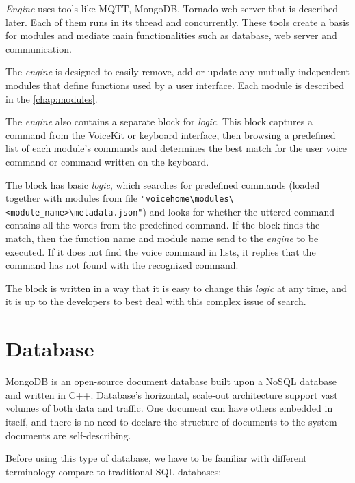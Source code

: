 \textit{Engine} uses tools like MQTT, MongoDB, Tornado web server that is described later. Each of them runs in its thread and concurrently. These tools create a basis for modules and mediate main functionalities such as database, web server and communication. 

The \textit{engine} is designed to easily remove, add or update any mutually independent modules that define functions used by a user interface. Each module is described in the \cref{chap:modules}.

The \textit{engine} also contains a separate block for \textit{logic}. This block captures a command from the VoiceKit or keyboard interface, then browsing a predefined list of each module's commands and determines the best match for the user voice command or command written on the keyboard.

The block has basic \textit{logic}, which searches for predefined commands (loaded together with modules from file \texttt{"voicehome\textbackslash modules\textbackslash <module\_name>\textbackslash metadata.json"}) and looks for whether the uttered command contains all the words from the predefined command. If the block finds the match, then the function name and module name send to the \textit{engine} to be executed. If it does not find the voice command in lists, it replies that the command has not found with the recognized command.

The block is written in a way that it is easy to change this \textit{logic} at any time, and it is up to the developers to best deal with this complex issue of search.

\section{Database} \label{section:database}

MongoDB is an open-source document database built upon a NoSQL database and written in C++. Database's horizontal, scale-out architecture support vast volumes of both data and traffic. One document can have others embedded in itself, and there is no need to declare the structure of documents to the system - documents are self-describing.\citep{mongoDB_jayaram_2020}

Before using this type of database, we have to be familiar with different terminology compare to traditional SQL databases: 

